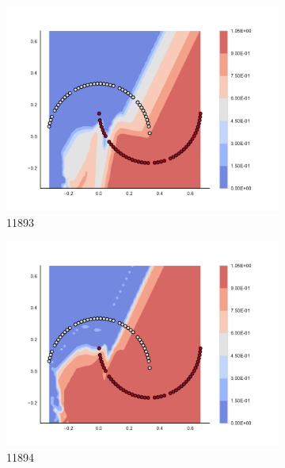         \begin{figure}[h]\ContinuedFloat
        
\begin{subfigure}[b]{0.09\textwidth}
    \includegraphics[clip, trim=2.35cm 1.75cm 4.5cm 0cm,width=\textwidth]{img/convergence/11893.pdf}
    \caption{11893}
    \label{fig:convergence_11893}
\end{subfigure}
%
\begin{subfigure}[b]{0.09\textwidth}
    \includegraphics[clip, trim=2.35cm 1.75cm 4.5cm 0cm,width=\textwidth]{img/convergence/11894.pdf}
    \caption{11894}
    \label{fig:convergence_11894}
\end{subfigure}
%
\begin{subfigure}[b]{0.09\textwidth}

\end{subfigure}
\end{figure}
